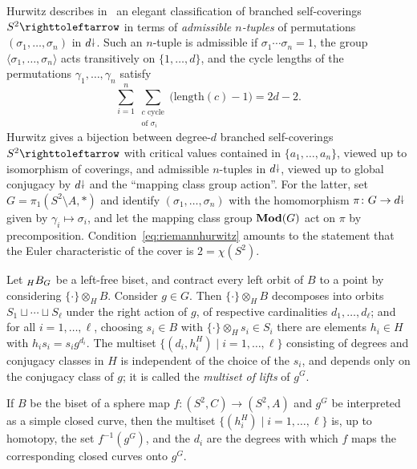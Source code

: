 \documentclass{amsart}
\begin{document}
Hurwitz describes in~\cite{hurwitz:ramifiedsurfaces} an
elegant classification of branched self-coverings $S^2\selfmap$ in
terms of \emph{admissible $n$-tuples} of permutations
$(\sigma_1,\dots,\sigma_n)$ in $d{\stackrel{\downarrow}{\smash.}}$. Such an $n$-tuple is
admissible if $\sigma_1\cdots\sigma_n=1$, the group
$\langle\sigma_1,\dots,\sigma_n\rangle$ acts transitively on
$\{1,\dots,d\}$, and the cycle lengths of the permutations
$\gamma_1,\dots,\gamma_n$ satisfy
\begin{equation}\label{eq:riemannhurwitz}
  \sum_{i=1}^n\sum_{\substack{c\text{ cycle}\\\text{of }\sigma_i}}\big(\text{length}(c)-1\big)=2d-2.
\end{equation}
Hurwitz gives a bijection between degree-$d$ branched self-coverings
$S^2\selfmap$ with critical values contained in $\{a_1,\dots,a_n\}$,
viewed up to isomorphism of coverings, and admissible $n$-tuples in
$d{\stackrel{\downarrow}{\smash.}}$, viewed up to global conjugacy by $d{\stackrel{\downarrow}{\smash.}}$ and the ``mapping
class group action''. For the latter, set $G=\pi_1(S^2\setminus A,*)$
and identify $(\sigma_1,\dots,\sigma_n)$ with the homomorphism
$\pi\colon G\to d{\stackrel{\downarrow}{\smash.}}$ given by $\gamma_i\mapsto\sigma_i$, and let
the mapping class group $\mathbf{\relax Mod}(G)$ act on $\pi$ by
precomposition. Condition~\eqref{eq:riemannhurwitz} amounts to the
statement that the Euler characteristic of the cover is $2=\chi(S^2)$.

\begin{defn}\label{defn:lifts}
  Let $\subscript H B_G$ be a left-free biset, and contract every left
  orbit of $B$ to a point by considering $\{\cdot\}\otimes_H
  B$. Consider $g\in G$. Then $\{\cdot\}\otimes_H B$ decomposes into
  orbits $S_1\sqcup\cdots\sqcup S_\ell$ under the right action of $g$,
  of respective cardinalities $d_1,\dots,d_\ell$; and for all
  $i=1,\dots,\ell$, choosing $s_i\in B$ with
  $\{\cdot\}\otimes_H s_i\in S_i$ there are elements $h_i\in H$ with
  $h_is_i=s_i g^{d_i}$. The multiset
  $\{(d_i,h_i^H)\mid i=1,\dots,\ell\}$ consisting of degrees and
  conjugacy classes in $H$ is independent of the choice of the $s_i$,
  and depends only on the conjugacy class of $g$; it is called the
  \emph{multiset of lifts} of $g^G$.
\end{defn}
If $B$ be the biset of a sphere map $f\colon (S^2,C)\to (S^2,A)$ and
$g^G$ be interpreted as a simple closed curve, then the multiset
$\{(h_i^H)\mid i=1,\dots,\ell\}$ is, up to homotopy, the set
$f^{-1}(g^G)$, and the $d_i$ are the degrees with which $f$ maps the
corresponding closed curves onto $g^G$.
\end{document}
